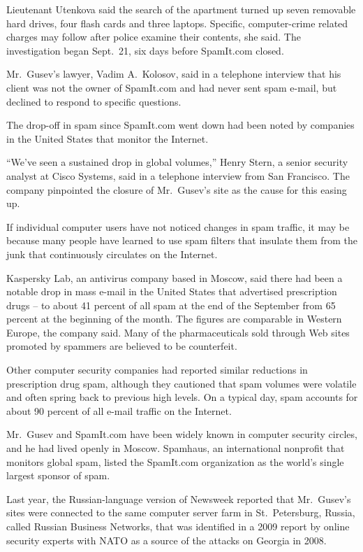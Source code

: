 ﻿\documentclass[12pt]{article}
\begin{document}
Lieutenant Utenkova said the search of the apartment turned up seven removable hard drives, four
flash cards and three laptops. Specific, computer-crime related charges may follow after police
examine their contents, she said. The investigation began Sept.~21, six days before SpamIt.com
closed.

Mr.~Gusev's lawyer, Vadim A.~Kolosov, said in a telephone interview that his client was not the
owner of SpamIt.com and had never sent spam e-mail, but declined to respond to specific questions.

The drop-off in spam since SpamIt.com went down had been noted by companies in the United States
that monitor the Internet.

``We've seen a sustained drop in global volumes,'' Henry Stern, a senior security analyst at Cisco
Systems, said in a telephone interview from San Francisco. The company pinpointed the closure of
Mr.~Gusev's site as the cause for this easing up.

If individual computer users have not noticed changes in spam traffic, it may be because many people
have learned to use spam filters that insulate them from the junk that continuously circulates on
the Internet.

Kaspersky Lab, an antivirus company based in Moscow, said there had been a notable drop in mass
e-mail in the United States that advertised prescription drugs -- to about 41 percent of all spam at
the end of the September from 65 percent at the beginning of the month. The figures are comparable
in Western Europe, the company said. Many of the pharmaceuticals sold through Web sites promoted by
spammers are believed to be counterfeit.

Other computer security companies had reported similar reductions in prescription drug spam,
although they cautioned that spam volumes were volatile and often spring back to previous high
levels. On a typical day, spam accounts for about 90 percent of all e-mail traffic on the Internet.

Mr.~Gusev and SpamIt.com have been widely known in computer security circles, and he had lived
openly in Moscow. Spamhaus, an international nonprofit that monitors global spam, listed the
SpamIt.com organization as the world's single largest sponsor of spam.

Last year, the Russian-language version of Newsweek reported that Mr.~Gusev's sites were connected
to the same computer server farm in St.~Petersburg, Russia, called Russian Business Networks, that
was identified in a 2009 report by online security experts with NATO as a source of the attacks on
Georgia in 2008.
\end{document}

